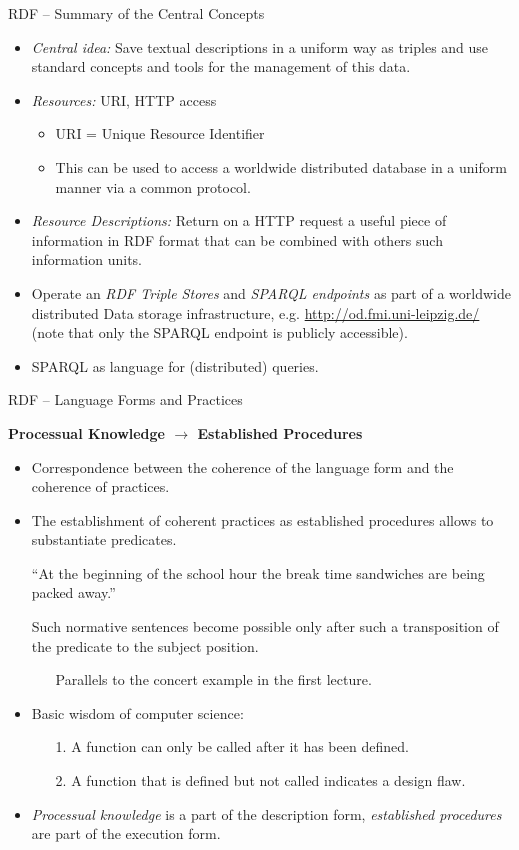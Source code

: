 \documentclass{beamer}
\newcommand{\ueberschrift}[1]{\begin{center}\bf #1\end{center}}
\begin{document}
\begin{frame}{RDF -- Summary of the Central Concepts}
\begin{itemize}
\item \emph{Central idea:} Save textual descriptions in a uniform way as
  triples and use standard concepts and tools for the management of this data.
\item \emph{Resources:} URI, HTTP access
  \begin{itemize}
  \item URI = Unique Resource Identifier
  \item This can be used to access a worldwide distributed database in a
    uniform manner via a common protocol.
  \end{itemize}
\item \emph{Resource Descriptions:} Return on a HTTP request a useful piece of
  information in RDF format that can be combined with others such information
  units.
\item Operate an \emph{RDF Triple Stores} and \emph{SPARQL endpoints} as part
  of a worldwide distributed Data storage infrastructure,
  e.g. \url{http://od.fmi.uni-leipzig.de/} (note that only the SPARQL endpoint
  is publicly accessible).
\item SPARQL as language for (distributed) queries.
\end{itemize}
\end{frame}
\begin{frame}{RDF -- Language Forms and Practices}
  \ueberschrift{Processual Knowledge $\to$ Established Procedures}
  \vspace{-2em}\small
\begin{itemize}
\item Correspondence between the coherence of the language form and the
  coherence of practices.
\item The establishment of coherent practices as established procedures allows
  to substantiate predicates.

  “At the beginning of the school hour the break time sandwiches are being
  packed away.”

  Such normative sentences become possible only after such a transposition of
  the predicate to the subject position.
  \begin{itemize}
  \item[] Parallels to the concert example in the first lecture.
  \end{itemize}
\item Basic wisdom of computer science:
  \begin{itemize}
  \item[1.] A function can only be called after it has been defined.
  \item[2.] A function that is defined but not called indicates a design flaw.
  \end{itemize}
\item \emph{Processual knowledge} is a part of the description form,
  \emph{established procedures} are part of the execution form.
\end{itemize}\vfill
\end{frame}
\end{document}
